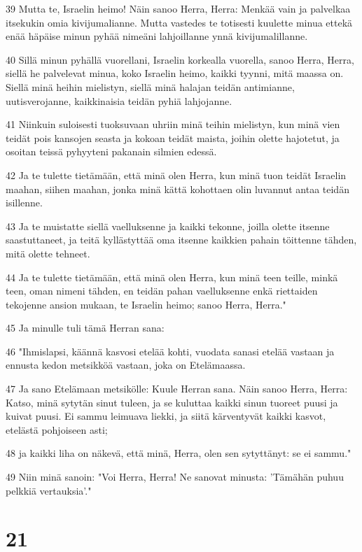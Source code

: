 \par 39 Mutta te, Israelin heimo! Näin sanoo Herra, Herra: Menkää vain ja palvelkaa itsekukin omia kivijumalianne. Mutta vastedes te totisesti kuulette minua ettekä enää häpäise minun pyhää nimeäni lahjoillanne ynnä kivijumalillanne.
\par 40 Sillä minun pyhällä vuorellani, Israelin korkealla vuorella, sanoo Herra, Herra, siellä he palvelevat minua, koko Israelin heimo, kaikki tyynni, mitä maassa on. Siellä minä heihin mielistyn, siellä minä halajan teidän antimianne, uutisverojanne, kaikkinaisia teidän pyhiä lahjojanne.
\par 41 Niinkuin suloisesti tuoksuvaan uhriin minä teihin mielistyn, kun minä vien teidät pois kansojen seasta ja kokoan teidät maista, joihin olette hajotetut, ja osoitan teissä pyhyyteni pakanain silmien edessä.
\par 42 Ja te tulette tietämään, että minä olen Herra, kun minä tuon teidät Israelin maahan, siihen maahan, jonka minä kättä kohottaen olin luvannut antaa teidän isillenne.
\par 43 Ja te muistatte siellä vaelluksenne ja kaikki tekonne, joilla olette itsenne saastuttaneet, ja teitä kyllästyttää oma itsenne kaikkien pahain töittenne tähden, mitä olette tehneet.
\par 44 Ja te tulette tietämään, että minä olen Herra, kun minä teen teille, minkä teen, oman nimeni tähden, en teidän pahan vaelluksenne enkä riettaiden tekojenne ansion mukaan, te Israelin heimo; sanoo Herra, Herra."
\par 45 Ja minulle tuli tämä Herran sana:
\par 46 "Ihmislapsi, käännä kasvosi etelää kohti, vuodata sanasi etelää vastaan ja ennusta kedon metsikköä vastaan, joka on Etelämaassa.
\par 47 Ja sano Etelämaan metsikölle: Kuule Herran sana. Näin sanoo Herra, Herra: Katso, minä sytytän sinut tuleen, ja se kuluttaa kaikki sinun tuoreet puusi ja kuivat puusi. Ei sammu leimuava liekki, ja siitä kärventyvät kaikki kasvot, etelästä pohjoiseen asti;
\par 48 ja kaikki liha on näkevä, että minä, Herra, olen sen sytyttänyt: se ei sammu."
\par 49 Niin minä sanoin: "Voi Herra, Herra! Ne sanovat minusta: 'Tämähän puhuu pelkkiä vertauksia'."

\chapter{21}

